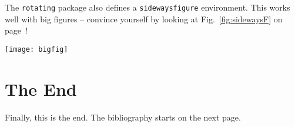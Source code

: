 The \texttt{rotating} package also defines a \texttt{sidewaysfigure}
environment. This works well with big figures -- convince yourself
by looking at Fig.~\ref{fig:sidewaysF} on page~\pageref{fig:sidewaysF}!

\begin{sidewaysfigure}[h]
  \texttt{[image: bigfig]}

  \caption{\label{fig:sidewaysF}A big figure that needs to go
   sideways.}
\end{sidewaysfigure}

\section{The End}
\label{sec:end}

Finally, this is the end.  The bibliography starts on
the next page.


